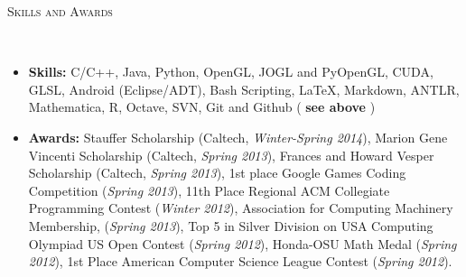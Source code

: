 \documentclass[9pt]{article}
\newenvironment{changemargin}[2]{%
  \begin{list}{}{%
    \setlength{\topsep}{0pt}%
    \setlength{\leftmargin}{#1}%
    \setlength{\rightmargin}{#2}%
    \setlength{\listparindent}{\parindent}%
    \setlength{\itemindent}{\parindent}%
    \setlength{\parsep}{\parskip}%
  }%
  \item[]}{\end{list}
}
\newcommand{\lineover}{
	\begin{changemargin}{-0.05in}{-0.05in}
		\vspace*{-8pt}
		\hrulefill \\
		\vspace*{-2pt}
	\end{changemargin}
}
\newcommand{\header}[1]{
	\begin{changemargin}{-0.5in}{-0.5in}
		\scshape{#1}\\
  	\lineover
	\end{changemargin}
}
\newenvironment{body} {
	\vspace*{-16pt}
	\begin{changemargin}{-0.25in}{-0.5in}
  }	
	{\end{changemargin}
}
\begin{document}
\header{Skills and Awards}
\smallskip
\begin{body}
	\vspace{14pt}
	
	\begin{itemize} \itemsep -0pt
	
	\item \textbf{Skills:} C/C++, Java, Python, OpenGL, JOGL and PyOpenGL, CUDA, GLSL, Android (Eclipse/ADT), Bash Scripting, \LaTeX, Markdown, ANTLR,  Mathematica, R, Octave, SVN, Git and Github ( \textbf{see above} )\\
	\medskip
	\item \textbf{Awards:} Stauffer Scholarship (Caltech, \emph{Winter-Spring 2014}), Marion Gene Vincenti Scholarship (Caltech, \emph{Spring 2013}),
        Frances and Howard Vesper Scholarship (Caltech, \emph{Spring 2013}),
        1st place Google Games Coding Competition (\emph{Spring 2013}),
        11th Place Regional ACM Collegiate Programming Contest (\emph{Winter 2012}),
        Association for Computing Machinery Membership, (\emph{Spring 2013}),
        Top 5 in Silver Division on USA Computing Olympiad US Open Contest (\emph{Spring 2012}),
        Honda-OSU Math Medal (\emph{Spring 2012}),
        1st Place American Computer Science League Contest (\emph{Spring 2012}).
	\end{itemize}
\end{body}
\end{document}
